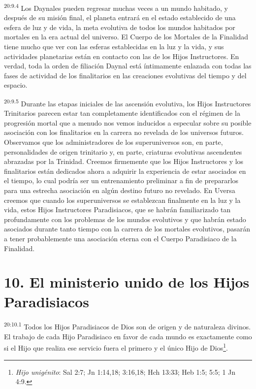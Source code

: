 \par
\textsuperscript{20:9.4} Los Daynales pueden regresar muchas veces a un mundo habitado, y después de su misión final, el planeta entrará en el estado establecido de una esfera de luz y de vida, la meta evolutiva de todos los mundos habitados por mortales en la era actual del universo. El Cuerpo de los Mortales de la Finalidad tiene mucho que ver con las esferas establecidas en la luz y la vida, y sus actividades planetarias están en contacto con las de los Hijos Instructores. En verdad, toda la orden de filiación Daynal está íntimamente enlazada con todas las fases de actividad de los finalitarios en las creaciones evolutivas del tiempo y del espacio.

\par
\textsuperscript{20:9.5} Durante las etapas iniciales de las ascensión evolutiva, los Hijos Instructores Trinitarios parecen estar tan completamente identificados con el régimen de la progresión mortal que a menudo nos vemos inducidos a especular sobre su posible asociación con los finalitarios en la carrera no revelada de los universos futuros. Observamos que los administradores de los superuniversos son, en parte, personalidades de origen trinitario y, en parte, criaturas evolutivas ascendentes abrazadas por la Trinidad. Creemos firmemente que los Hijos Instructores y los finalitarios están dedicados ahora a adquirir la experiencia de estar asociados en el tiempo, lo cual podría ser un entrenamiento preliminar a fin de prepararlos para una estrecha asociación en algún destino futuro no revelado. En Uversa creemos que cuando los superuniversos se establezcan finalmente en la luz y la vida, estos Hijos Instructores Paradisiacos, que se habrán familiarizado tan profundamente con los problemas de los mundos evolutivos y que habrán estado asociados durante tanto tiempo con la carrera de los mortales evolutivos, pasarán a tener probablemente una asociación eterna con el Cuerpo Paradisiaco de la Finalidad.

\section*{10. El ministerio unido de los Hijos Paradisiacos}
\par
\textsuperscript{20:10.1} Todos los Hijos Paradisiacos de Dios son de origen y de naturaleza divinos. El trabajo de cada Hijo Paradisiaco en favor de cada mundo es exactamente como si el Hijo que realiza ese servicio fuera el primero y el único Hijo de Dios\footnote{\textit{Hijo unigénito}: Sal 2:7; Jn 1:14,18; 3:16,18; Hch 13:33; Heb 1:5; 5:5; 1 Jn 4:9.}.

